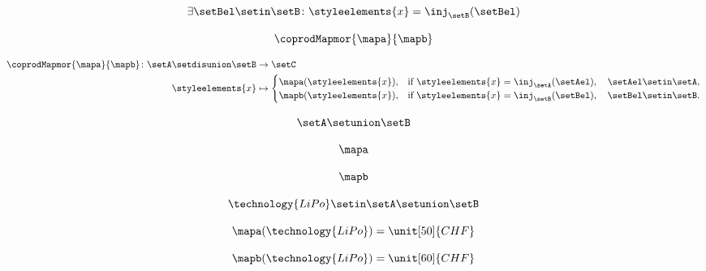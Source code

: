 \begin{forslides}
    \begin{equation}
        \label{eq:feedback-105}
        \exists \setBel\setin \setB\colon \styleelements{x}=\inj_\setB(\setBel)
    \end{equation}

    \begin{equation}
        \label{eq:feedback-106}
        \coprodMapmor{\mapa}{\mapb}
    \end{equation}

    \begin{equation}
        \label{eq:feedback-107}
        \begin{aligned}
            \coprodMapmor{\mapa}{\mapb} \colon  \setA \setdisunion \setB & \to \setC \\
            \styleelements{x}                                            & \mapsto
            \begin{cases}
                \mapa(\styleelements{x}), & \text{if } \styleelements{x}=\inj_\setA(\setAel),\quad \setAel \setin \setA, \\
                \mapb(\styleelements{x}), & \text{if } \styleelements{x}=\inj_\setB(\setBel),\quad \setBel \setin \setB.
            \end{cases}
        \end{aligned}
    \end{equation}

    \begin{equation}
        \label{eq:feedback-108}
        \setA\setunion \setB
    \end{equation}

    \begin{equation}
        \label{eq:feedback-109}
        \mapa
    \end{equation}

    \begin{equation}
        \label{eq:feedback-110}
        \mapb
    \end{equation}

    \begin{equation}
        \label{eq:feedback-111}
        \technology{LiPo}\setin \setA\setunion \setB
    \end{equation}

    \begin{equation}
        \label{eq:feedback-112}
        \mapa(\technology{LiPo})=\unit[50]{CHF}
    \end{equation}

    \begin{equation}
        \label{eq:feedback-113}
        \mapb(\technology{LiPo})=\unit[60]{CHF}
    \end{equation}


\end{forslides}
